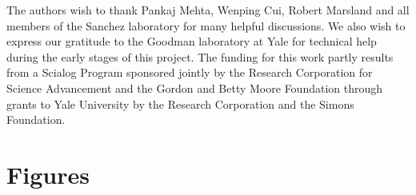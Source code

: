 \documentclass[a4paper,10pt]{article}
\begin{document}
The authors wish to thank Pankaj Mehta, Wenping Cui,
Robert Marsland and all members of the Sanchez laboratory
for many helpful discussions.
We also wish to express our gratitude to the Goodman laboratory at Yale
for technical help during the early stages of this project.
The funding for this work partly results from a Scialog Program
sponsored jointly by the Research Corporation for Science Advancement and
the Gordon and Betty Moore Foundation through grants to Yale University by the
Research Corporation and the Simons Foundation.

\clearpage


\clearpage

\section*{Figures}\label{figs}
\end{document}
